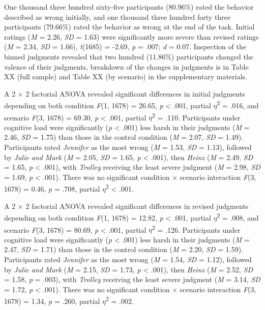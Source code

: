 \documentclass[
  american,
  man]{apa7}
\begin{document}
One thousand three hundred sixty-five participants (80.96\%) rated the behavior described as wrong initially, and one thousand three hundred forty three participants (79.66\%) rated the behavior as wrong at the end of the task. Initial ratings (\emph{M} = 2.26, \emph{SD} = 1.63) were significantly more severe than revised ratings (\emph{M} = 2.34, \emph{SD} = 1.66), \emph{t}(1685) = -2.69, \emph{p} = .007; \emph{d} = 0.07. Inspection of the binned judgments revealed that two hundred (11.86\%) participants changed the valence of their judgments, breakdown of the changes in judgments is in Table XX (full sample) and Table XX (by scenario) in the supplementary materials.

A 2 \(\times\) 2 factorial ANOVA revealed significant differences in initial judgments depending on both condition \emph{F}(1, 1678) = 26.65, \emph{p} \textless{} .001, partial \(\eta\)\textsuperscript{2} = .016, and scenario \emph{F}(3, 1678) = 69.30, \emph{p} \textless{} .001, partial \(\eta\)\textsuperscript{2} = .110. Participants under cognitive load were significantly (\emph{p} \textless{} .001) less harsh in their judgments (\emph{M} = 2.46, \emph{SD} = 1.75) than those in the control condition (\emph{M} = 2.07, \emph{SD} = 1.49). Participants rated \emph{Jennifer} as the most wrong (\emph{M} = 1.53, \emph{SD} = 1.13), followed by \emph{Julie and Mark} (\emph{M} = 2.05, \emph{SD} = 1.65, \emph{p} \textless{} .001), then \emph{Heinz} (\emph{M} = 2.49, \emph{SD} = 1.65, \emph{p} \textless{} .001), with \emph{Trolley} receiving the least severe judgment (\emph{M} = 2.98, \emph{SD} = 1.69, \emph{p} \textless{} .001). There was no significant condition \(\times\) scenario interaction \emph{F}(3, 1678) = 0.46, \emph{p} = .708, partial \(\eta\)\textsuperscript{2} \textless{} .001.

A 2 \(\times\) 2 factorial ANOVA revealed significant differences in revised judgments depending on both condition \emph{F}(1, 1678) = 12.82, \emph{p} \textless{} .001, partial \(\eta\)\textsuperscript{2} = .008, and scenario \emph{F}(3, 1678) = 80.69, \emph{p} \textless{} .001, partial \(\eta\)\textsuperscript{2} = .126. Participants under cognitive load were significantly (\emph{p} \textless{} .001) less harsh in their judgments (\emph{M} = 2.47, \emph{SD} = 1.71) than those in the control condition (\emph{M} = 2.20, \emph{SD} = 1.59). Participants rated \emph{Jennifer} as the most wrong (\emph{M} = 1.54, \emph{SD} = 1.12), followed by \emph{Julie and Mark} (\emph{M} = 2.15, \emph{SD} = 1.73, \emph{p} \textless{} .001), then \emph{Heinz} (\emph{M} = 2.52, \emph{SD} = 1.58, \emph{p} = .003), with \emph{Trolley} receiving the least severe judgment (\emph{M} = 3.14, \emph{SD} = 1.72, \emph{p} \textless{} .001). There was no significant condition \(\times\) scenario interaction \emph{F}(3, 1678) = 1.34, \emph{p} = .260, partial \(\eta\)\textsuperscript{2} = .002.
\end{document}
